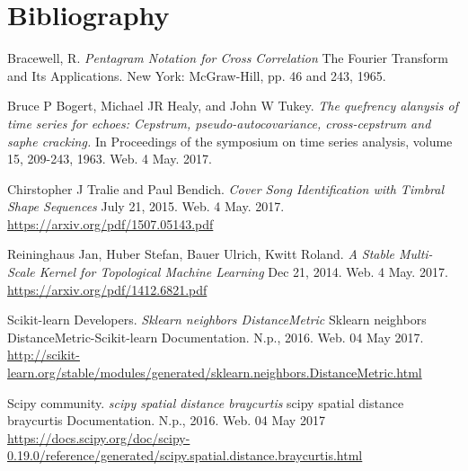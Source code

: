 \documentclass[12pt]{article}
\begin{document}
\section{Bibliography}
\begin{thebibliography}{1}

Bracewell, R. \textit{Pentagram Notation for Cross Correlation} The Fourier
Transform and Its Applications. New York: McGraw-Hill, pp. 46 and 243, 1965.

Bruce P Bogert, Michael JR Healy, and John W Tukey. \textit{The quefrency
alanysis of time series for echoes: Cepstrum, pseudo-autocovariance,
cross-cepstrum and saphe cracking.} In Proceedings of the symposium on time
series analysis, volume 15, 209-243, 1963. Web. 4 May. 2017.

Chirstopher J Tralie and Paul Bendich. \textit{Cover Song Identification with
Timbral Shape Sequences} July 21, 2015. Web. 4 May. 2017.
\url{https://arxiv.org/pdf/1507.05143.pdf}

Reininghaus Jan, Huber Stefan, Bauer Ulrich, Kwitt Roland. \textit{A Stable
Multi-Scale Kernel for Topological Machine Learning} Dec 21, 2014. Web. 4 May.
2017. \url{https://arxiv.org/pdf/1412.6821.pdf}

Scikit-learn Developers. \textit{Sklearn neighbors DistanceMetric}
Sklearn neighbors DistanceMetric-Scikit-learn Documentation. N.p., 2016.
Web. 04 May 2017.
\url{http://scikit-learn.org/stable/modules/generated/sklearn.neighbors.DistanceMetric.html}

Scipy community. \textit{scipy spatial distance braycurtis} scipy spatial
distance braycurtis Documentation. N.p., 2016. Web. 04 May 2017
\url{https://docs.scipy.org/doc/scipy-0.19.0/reference/generated/scipy.spatial.distance.braycurtis.html}

\end{thebibliography}
\end{document}
